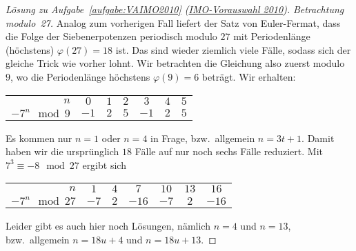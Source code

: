 \begin{proof}[Lösung zu Aufgabe~\ref{aufgabe:VAIMO2010} \textmd{(\href{https://www.mathe-wettbewerbe.de/fileadmin/Mathe-Wettbewerbe/AIMO/Aufgaben_und_Loesungen_AIMO/aufgaben_awb_10.pdf}{IMO-Vorauswahl 2010})}]
	
	\emph{Betrachtung modulo~27.} Analog zum vorherigen Fall liefert der Satz von Euler-Fermat, dass die Folge der Siebenerpotenzen periodisch modulo $27$ mit Periodenlänge (höchstens) $\varphi(27)=18$ ist. Das sind wieder ziemlich viele Fälle, sodass sich der gleiche Trick wie vorher lohnt. Wir betrachten die Gleichung also zuerst modulo~$9$, wo die Periodenlänge höchstens $\varphi(9)=6$ beträgt. Wir erhalten:
	\begin{center}
		\begin{tabular}{r | c c c c c c}\toprule
			$n$ & $0$ & $1$ & $2$ & $3$ & $4$ & $5$ \\%
			$-7^n\mod 9$ & $-1$ & $2$ & $5$ & $-1$ & $2$ & $5$\\\bottomrule
		\end{tabular}
	\end{center}
	Es kommen nur $n=1$ oder $n=4$ in Frage, bzw.\ allgemein $n=3t+1$. Damit haben wir die ursprünglich $18$ Fälle auf nur noch sechs Fälle reduziert. Mit $7^3\equiv -8\mod 27$ ergibt sich
	\begin{center}
		\begin{tabular}{r | c c c c c c}\toprule
			$n$ & $1$ & $4$ & $7$ & $10$ & $13$ & $16$ \\%
			$-7^n\mod 27$ & $-7$ & $2$ & $-16$ & $-7$ & $2$ & $-16$\\\bottomrule
		\end{tabular}
	\end{center}
	Leider gibt es auch hier noch Lösungen, nämlich $n=4$ und $n=13$, bzw.\ allgemein $n=18u+4$ und $n=18u+13$.
	

\end{proof}
